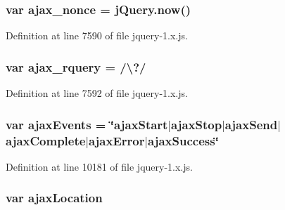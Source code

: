 \subsubsection[{\texorpdfstring{ajax\+\_\+nonce}{ajax_nonce}}]{\setlength{\rightskip}{0pt plus 5cm}var ajax\+\_\+nonce = j\+Query.\+now()}\hypertarget{jquery-1_8x_8js_aaa43e6d4c76ee8be878dd7e93fb755a4}{}\label{jquery-1_8x_8js_aaa43e6d4c76ee8be878dd7e93fb755a4}


Definition at line 7590 of file jquery-\/1.\+x.\+js.

\subsubsection[{\texorpdfstring{ajax\+\_\+rquery}{ajax_rquery}}]{\setlength{\rightskip}{0pt plus 5cm}var ajax\+\_\+rquery = /\textbackslash{}?/}\hypertarget{jquery-1_8x_8js_a4da85c0011217bf1643139dc23999c5c}{}\label{jquery-1_8x_8js_a4da85c0011217bf1643139dc23999c5c}


Definition at line 7592 of file jquery-\/1.\+x.\+js.

\subsubsection[{\texorpdfstring{ajax\+Events}{ajaxEvents}}]{\setlength{\rightskip}{0pt plus 5cm}var ajax\+Events = \char`\"{}ajax\+Start$\vert$ajax\+Stop$\vert$ajax\+Send$\vert$ajax\+Complete$\vert$ajax\+Error$\vert$ajax\+Success\char`\"{}}\hypertarget{jquery-1_8x_8js_a21e0b565383650a791b28405f8de0984}{}\label{jquery-1_8x_8js_a21e0b565383650a791b28405f8de0984}


Definition at line 10181 of file jquery-\/1.\+x.\+js.

\subsubsection[{\texorpdfstring{ajax\+Location}{ajaxLocation}}]{\setlength{\rightskip}{0pt plus 5cm}var ajax\+Location}\hypertarget{jquery-1_8x_8js_a1661d4e1676e7c6ffde5a3cb8d8ae246}{}\label{jquery-1_8x_8js_a1661d4e1676e7c6ffde5a3cb8d8ae246}


